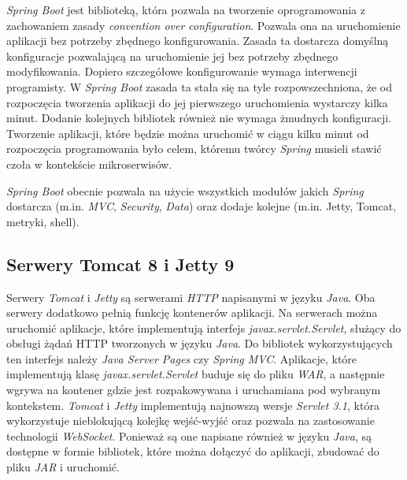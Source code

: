 \textsl{Spring Boot} jest biblioteką, która pozwala na tworzenie oprogramowania z zachowaniem zasady \textsl{convention over configuration}. Pozwala ona na uruchomienie aplikacji bez potrzeby zbędnego konfigurowania. Zasada ta dostarcza domyślną konfiguracje pozwalającą na uruchomienie jej bez potrzeby zbędnego modyfikowania. Dopiero szczegółowe konfigurowanie wymaga interwencji programisty. W \textsl{Spring Boot} zasada ta stała się na tyle rozpowszechniona, że od rozpoczęcia tworzenia aplikacji do jej pierwszego uruchomienia wystarczy kilka minut. Dodanie kolejnych bibliotek również nie wymaga żmudnych konfiguracji. Tworzenie aplikacji, które będzie można uruchomić w ciągu kilku minut od rozpoczęcia programowania było celem, któremu twórcy \textsl{Spring} musieli stawić czoła w kontekście mikroserwisów. 

\textsl{Spring Boot} obecnie pozwala na użycie wszystkich modułów jakich \textsl{Spring} dostarcza (m.in. \textsl{MVC}, \textsl{Security}, \textsl{Data}) oraz dodaje kolejne (m.in. Jetty, Tomcat, metryki, shell). 

\subsection{Serwery Tomcat 8 i Jetty 9} 
Serwery \textsl{Tomcat} i \textsl{Jetty} są serwerami \textsl{HTTP} napisanymi w języku \textsl{Java}. Oba serwery dodatkowo pełnią funkcję kontenerów aplikacji. Na serwerach można uruchomić aplikacje, które implementują interfejs \textsl{javax.servlet.Servlet}, służący do obsługi żądań HTTP tworzonych w języku \textsl{Java}. Do bibliotek wykorzystujących ten interfejs należy \textsl{Java Server Pages} czy \textsl{Spring MVC}. Aplikacje, które implementują klasę \textsl{javax.servlet.Servlet} buduje się do pliku \textsl{WAR}, a następnie wgrywa na kontener gdzie jest rozpakowywana i uruchamiana pod wybranym kontekstem. \textsl{Tomcat} i \textsl{Jetty} implementują najnowszą wersje \textsl{Servlet 3.1}, która wykorzystuje nieblokującą kolejkę wejść-wyjść oraz pozwala na zastosowanie technologii \textsl{WebSocket}. Ponieważ są one napisane również w języku \textsl{Java}, są dostępne w formie bibliotek, które można dołączyć do aplikacji, zbudować do pliku \textsl{JAR} i uruchomić. 
